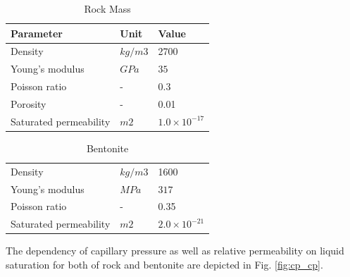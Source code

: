 \begin{table}[!thb]
\begin{center}
\begin{tabular}{lll}
\hline \hline
Parameter   &  Unit  & Value\\
\hline \hline
 Density &  $kg/m3$ &  2700 \\
 Young's modulus &  $GPa$ &  $35$ \\
 Poisson ratio & - &  0.3 \\
 Porosity & - &  0.01 \\
 Saturated permeability &  $m2$  & $1.0
\times10^{-17}$ \\
\hline \hline
\end{tabular}
\end{center}
\caption{\label{tab:hm_rock}Rock Mass}

\end{table}
\begin{table}[!thb]
\begin{center}
\begin{tabular}{lll}
\hline \hline
 Density &  $kg/m3$ &  1600 \\
 Young's modulus &  $MPa$ &  $317$\\
 Poisson ratio & - &  0.35 \\
 Saturated permeability &  $m2$  & $2.0
\times10^{-21}$ \\
\hline \hline
\end{tabular}
\end{center}
\caption{\label{tab:hm_bentonite}Bentonite}
\end{table}

The dependency of capillary pressure
as well as relative permeability on liquid saturation for both of
rock and bentonite are depicted in Fig. \ref{fig:cp_cp}.

